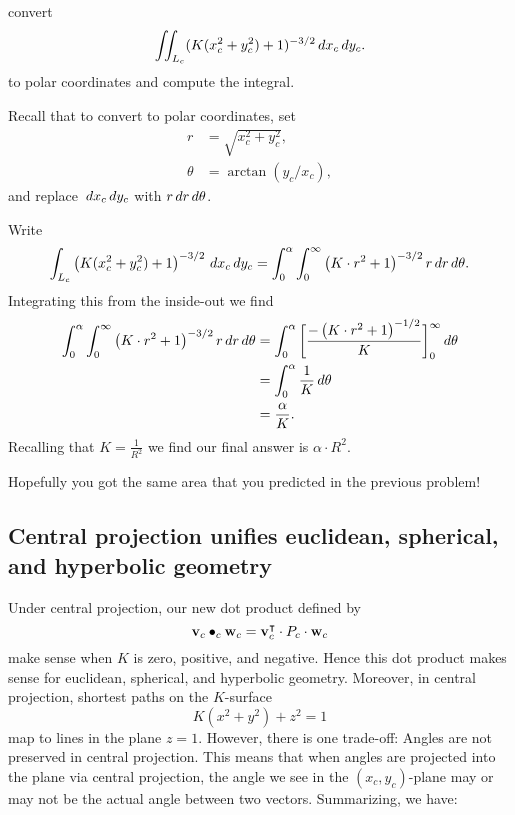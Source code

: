 \documentclass[newpage,hints,12pt,noauthor,handout,nooutcomes]{ximera}
\begin{document}
\begin{problem}
\begin{center}
  \end{center}
  convert
  \[
  \iint_{L_c} (K(x_c^2+y_c^2)+1)^{-3/2} \,d x_c\,d y_c.
  \]
  to polar coordinates and compute the integral.
  \begin{hint}
    Recall that to convert to polar coordinates, set
    \begin{align*}
      r &= \sqrt{x_c^2+y_c^2},\\
      \theta &= \arctan(y_c/x_c),
    \end{align*}
    and replace $\,d x_c\,d y_c$ with $r\,d r\,d \theta$.
  \end{hint}
  \begin{freeResponse}
    Write
    \[
    \int_{L_c}
    \left(K(x_c^2+y_c^2)+1\right)^{-3/2} \,d x_c\,d
    y_c = \int_0^\alpha \int_0^\infty \left(K\cdot r^2+1\right)^{-3/2} r\,d r \,d \theta.
    \]
    Integrating this from the inside-out we find
    \begin{align*}
      \int_0^\alpha \int_0^\infty \left(K\cdot r^2+1\right)^{-3/2} r\,d r \,d \theta
      &= \int_0^\alpha \bigg[ \frac{-\left(K\cdot r^2+1\right)^{-1/2}}{K} \bigg]_0^\infty \,d \theta\\
      &= \int_0^\alpha \frac{1}{K} \,d \theta\\
      &= \frac{\alpha}{K}.   
    \end{align*}
    Recalling that $K = \frac{1}{R^2}$ we find our final answer is $\alpha \cdot R^2$.
  \end{freeResponse}
\end{problem}

Hopefully you got the same area that you predicted in the previous problem!

\subsection{Central projection unifies euclidean, spherical, and hyperbolic geometry}

Under central projection, our new dot product defined by
\[
\mathbf{v}_c \bullet_c \mathbf{w}_c = \mathbf{v}_c^\intercal \cdot P_c \cdot \mathbf{w}_c
\]
make sense when $K$ is zero, positive, and negative. Hence this dot
product makes sense for euclidean, spherical, and hyperbolic
geometry. Moreover, in central projection, shortest paths on the $K$-surface
\[
K(x^2 + y^2) + z^2 = 1
\]
map to lines in the plane $z=1$. However, there is one trade-off:
Angles are not preserved in central projection. This means that when
angles are projected into the plane via central projection, the angle
we see in the $(x_c,y_c)$-plane may or may not be the actual angle
between two vectors. Summarizing, we have:
\end{document}
